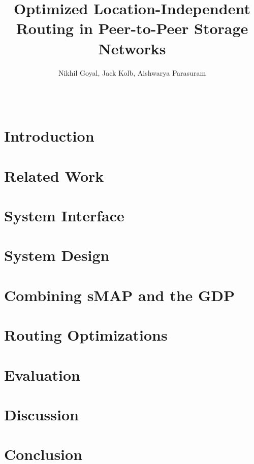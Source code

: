 \documentclass{acm_proc_article-sp}
\begin{document}
\title{Optimized Location-Independent Routing in Peer-to-Peer Storage Networks}
\author{
\alignauthor Nikhil Goyal, Jack Kolb, Aishwarya Parasuram\\
\\
\\
}
\maketitle
\begin{abstract}

\end{abstract}

\section{Introduction}


\section{Related Work}


\section{System Interface}


\section{System Design}


\section{Combining sMAP and the GDP}


\section{Routing Optimizations}


\section{Evaluation}


\section{Discussion}


\section{Conclusion}



\nocite{*}

\end{document}
